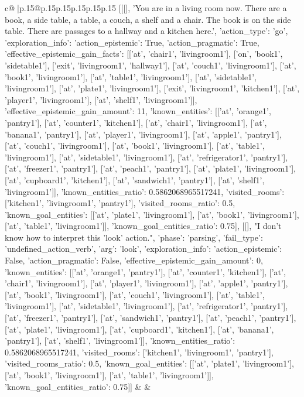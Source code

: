 \documentclass{article}
\begin{document}
{\begin{supertabular}{c@{$\;$}|p{.15\linewidth}@{}p{.15\linewidth}p{.15\linewidth}p{.15\linewidth}p{.15\linewidth}p{.15\linewidth}}
{{{	 [[[], 'You are in a living room now. There are a book, a side table, a table, a couch, a shelf and a chair. The book is on the side table. There are passages to a hallway and a kitchen here.', {'action_type': 'go', 'exploration_info': {'action_epistemic': True, 'action_pragmatic': True, 'effective_epistemic_gain_facts': [['at', 'chair1', 'livingroom1'], ['on', 'book1', 'sidetable1'], ['exit', 'livingroom1', 'hallway1'], ['at', 'couch1', 'livingroom1'], ['at', 'book1', 'livingroom1'], ['at', 'table1', 'livingroom1'], ['at', 'sidetable1', 'livingroom1'], ['at', 'plate1', 'livingroom1'], ['exit', 'livingroom1', 'kitchen1'], ['at', 'player1', 'livingroom1'], ['at', 'shelf1', 'livingroom1']], 'effective_epistemic_gain_amount': 11, 'known_entities': [['at', 'orange1', 'pantry1'], ['at', 'counter1', 'kitchen1'], ['at', 'chair1', 'livingroom1'], ['at', 'banana1', 'pantry1'], ['at', 'player1', 'livingroom1'], ['at', 'apple1', 'pantry1'], ['at', 'couch1', 'livingroom1'], ['at', 'book1', 'livingroom1'], ['at', 'table1', 'livingroom1'], ['at', 'sidetable1', 'livingroom1'], ['at', 'refrigerator1', 'pantry1'], ['at', 'freezer1', 'pantry1'], ['at', 'peach1', 'pantry1'], ['at', 'plate1', 'livingroom1'], ['at', 'cupboard1', 'kitchen1'], ['at', 'sandwich1', 'pantry1'], ['at', 'shelf1', 'livingroom1']], 'known_entities_ratio': 0.5862068965517241, 'visited_rooms': ['kitchen1', 'livingroom1', 'pantry1'], 'visited_rooms_ratio': 0.5, 'known_goal_entities': [['at', 'plate1', 'livingroom1'], ['at', 'book1', 'livingroom1'], ['at', 'table1', 'livingroom1']], 'known_goal_entities_ratio': 0.75}}], [[], "I don't know how to interpret this 'look' action.", {'phase': 'parsing', 'fail_type': 'undefined_action_verb', 'arg': 'look', 'exploration_info': {'action_epistemic': False, 'action_pragmatic': False, 'effective_epistemic_gain_amount': 0, 'known_entities': [['at', 'orange1', 'pantry1'], ['at', 'counter1', 'kitchen1'], ['at', 'chair1', 'livingroom1'], ['at', 'player1', 'livingroom1'], ['at', 'apple1', 'pantry1'], ['at', 'book1', 'livingroom1'], ['at', 'couch1', 'livingroom1'], ['at', 'table1', 'livingroom1'], ['at', 'sidetable1', 'livingroom1'], ['at', 'refrigerator1', 'pantry1'], ['at', 'freezer1', 'pantry1'], ['at', 'sandwich1', 'pantry1'], ['at', 'peach1', 'pantry1'], ['at', 'plate1', 'livingroom1'], ['at', 'cupboard1', 'kitchen1'], ['at', 'banana1', 'pantry1'], ['at', 'shelf1', 'livingroom1']], 'known_entities_ratio': 0.5862068965517241, 'visited_rooms': ['kitchen1', 'livingroom1', 'pantry1'], 'visited_rooms_ratio': 0.5, 'known_goal_entities': [['at', 'plate1', 'livingroom1'], ['at', 'book1', 'livingroom1'], ['at', 'table1', 'livingroom1']], 'known_goal_entities_ratio': 0.75}}]] 
	  } 
	   } 
	   } 
	 & & \\ 
 


\end{supertabular}}
\end{document}
